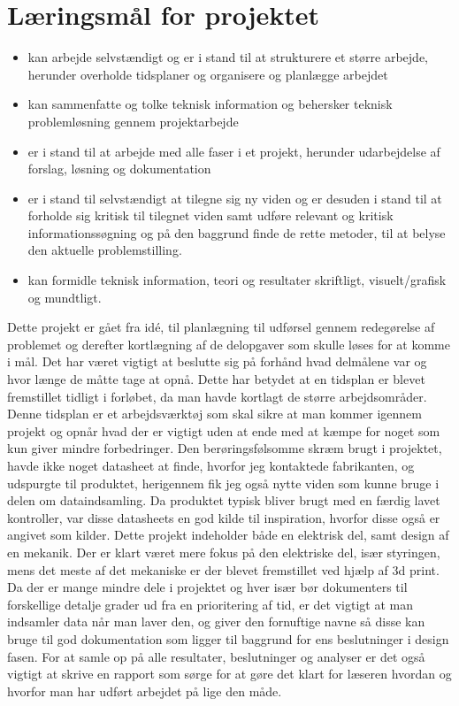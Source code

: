 \section{Læringsmål for projektet}
\begin{itemize}
    \item kan arbejde selvstændigt og er i stand til at strukturere et større arbejde, herunder overholde tidsplaner og organisere og planlægge arbejdet
    \item kan sammenfatte og tolke teknisk information og behersker teknisk problemløsning gennem projektarbejde
    \item er i stand til at arbejde med alle faser i et projekt, herunder udarbejdelse af forslag, løsning og dokumentation
    \item er i stand til selvstændigt at tilegne sig ny viden og er desuden i stand til at forholde sig kritisk til tilegnet viden samt udføre relevant og kritisk informationssøgning og på den baggrund finde de rette metoder, til at belyse den aktuelle problemstilling.
    \item kan formidle teknisk information, teori og resultater skriftligt, visuelt/grafisk og mundtligt.
\end{itemize}
Dette projekt er gået fra idé, til planlægning til udførsel gennem redegørelse af problemet og derefter kortlægning af de delopgaver som skulle løses for at komme i mål. Det har været vigtigt at beslutte sig på forhånd hvad delmålene var og hvor længe de måtte tage at opnå.
Dette har betydet at en tidsplan er blevet fremstillet tidligt i forløbet, da man havde kortlagt de større arbejdsområder. Denne tidsplan er et arbejdsværktøj som skal sikre at man kommer igennem projekt og opnår hvad der er vigtigt uden at ende med at kæmpe for noget som kun giver mindre forbedringer.
Den berøringsfølsomme skræm brugt i projektet, havde ikke noget datasheet at finde, hvorfor jeg kontaktede fabrikanten, og udspurgte til produktet, herigennem fik jeg også nytte viden som kunne bruge i delen om dataindsamling. Da produktet typisk bliver brugt med en færdig lavet kontroller, var disse datasheets en god kilde til inspiration, hvorfor disse også er angivet som kilder. 
Dette projekt indeholder både en elektrisk del, samt design af en mekanik. Der er klart været mere fokus på den elektriske del, især styringen, mens det meste af det mekaniske er der blevet fremstillet ved hjælp af 3d print.
Da der er mange mindre dele i projektet og hver især bør dokumenters til forskellige detalje grader ud fra en prioritering af tid, er det vigtigt at man indsamler data når man laver den, og giver den fornuftige navne så disse kan bruge til god dokumentation som ligger til baggrund for ens beslutninger i design fasen.
For at samle op på alle resultater, beslutninger og analyser er det også vigtigt at skrive en rapport som sørge for at gøre det klart for læseren hvordan og hvorfor man har udført arbejdet på lige den måde.
\clearpage
